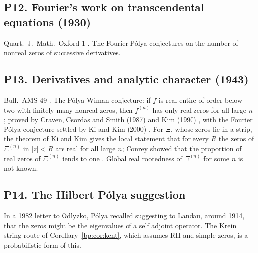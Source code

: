 \subsection*{P12. Fourier's work on transcendental equations (1930)}
Quart.\ J.\ Math.\ Oxford 1 \cite{Polya30}. The Fourier P\'olya conjectures on the number of nonreal zeros of successive derivatives.

\subsection*{P13. Derivatives and analytic character (1943)}
Bull.\ AMS 49 \cite{Polya43}. The P\'olya Wiman conjecture: if $f$ is real entire of order below two with finitely many nonreal zeros, then $f^{(n)}$ has only real zeros for all large $n$; proved by Craven, Csordas and Smith (1987) \cite{CCS87} and Kim (1990) \cite{Kim90}, with the Fourier P\'olya conjecture settled by Ki and Kim (2000) \cite{KiKim00}. For $\Xi$, whose zeros lie in a strip, the theorem of Ki and Kim gives the local statement that for every $R$ the zeros of $\Xi^{(n)}$ in $|z|<R$ are real for all large $n$; Conrey showed that the proportion of real zeros of $\Xi^{(n)}$ tends to one \cite{Conrey83}. Global real rootedness of $\Xi^{(n)}$ for some $n$ is not known.

\subsection*{P14. The Hilbert P\'olya suggestion}
In a 1982 letter to Odlyzko, P\'olya recalled suggesting to Landau, around 1914, that the zeros might be the eigenvalues of a self adjoint operator. The Krein string route of Corollary~\ref{bp:cor:kent}, which assumes RH and simple zeros, is a probabilistic form of this.

